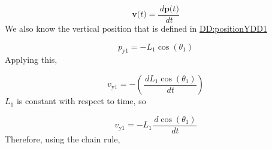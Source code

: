 \documentclass[12pt]{article}
\begin{document}
\begin{displaymath}
\symbf{v}\text{(}t\text{)}=\frac{\,d\symbf{p}\text{(}t\text{)}}{\,dt}
\end{displaymath}
We also know the vertical position that is defined in \hyperref[DD:positionYDD1]{DD:positionYDD1}

\begin{displaymath}
{p_{\text{y}1}}=-{L_{1}} \cos\left({θ_{1}}\right)
\end{displaymath}
Applying this,

\begin{displaymath}
{v_{\text{y}1}}=-\left(\frac{\,d{L_{1}} \cos\left({θ_{1}}\right)}{\,dt}\right)
\end{displaymath}
${L_{1}}$ is constant with respect to time, so

\begin{displaymath}
{v_{\text{y}1}}=-{L_{1}} \frac{\,d\cos\left({θ_{1}}\right)}{\,dt}
\end{displaymath}
Therefore, using the chain rule,
\end{document}
